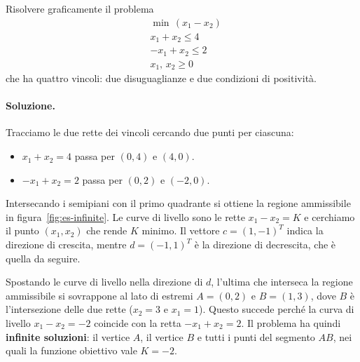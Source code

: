 \begin{esercizio}
Risolvere graficamente il problema
\[
\begin{aligned}
&\min\, (x_1 - x_2) \\
&x_1 + x_2 \le 4 \\
&{-x_1} + x_2 \le 2 \\
&x_1,\, x_2 \ge 0
\end{aligned}
\]
che ha quattro vincoli: due disuguaglianze e due condizioni di positività.
\end{esercizio}

\paragraph{Soluzione.}
Tracciamo le due rette dei vincoli cercando due punti per ciascuna:
\begin{itemize}
    \item $x_1 + x_2 = 4$ passa per $(0, 4)$ e $(4, 0)$.
    \item $-x_1 + x_2 = 2$ passa per $(0, 2)$ e $(-2, 0)$.
\end{itemize}
Intersecando i semipiani con il primo quadrante si ottiene la regione ammissibile in figura~\ref{fig:es-infinite}. Le curve di livello sono le rette $x_1 - x_2 = K$ e cerchiamo il punto $(x_1, x_2)$ che rende $K$ minimo. Il vettore $c = (1, -1)^T$ indica la direzione di crescita, mentre $d = (-1, 1)^T$ è la direzione di decrescita, che è quella da seguire.

Spostando le curve di livello nella direzione di $d$, l'ultima che interseca la regione ammissibile si sovrappone al lato di estremi $A = (0, 2)$ e $B = (1, 3)$, dove $B$ è l'intersezione delle due rette ($x_2 = 3$ e $x_1 = 1$). Questo succede perché la curva di livello $x_1 - x_2 = -2$ coincide con la retta $-x_1 + x_2 = 2$. Il problema ha quindi \textbf{infinite soluzioni}: il vertice $A$, il vertice $B$ e tutti i punti del segmento $AB$, nei quali la funzione obiettivo vale $K = -2$.

